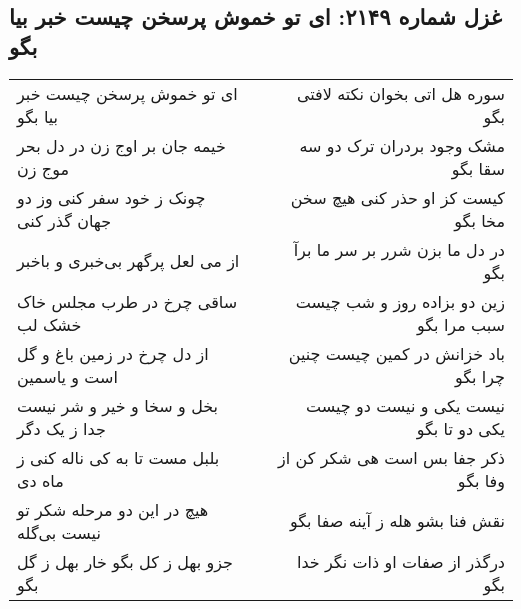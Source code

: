 \begin{center}
\section*{غزل شماره ۲۱۴۹: ای تو خموش پرسخن چیست خبر بیا بگو}
\label{sec:2149}
\begin{longtable}{l p{0.5cm} r}
ای تو خموش پرسخن چیست خبر بیا بگو
&&
سوره هل اتی بخوان نکته لافتی بگو
\\
خیمه جان بر اوج زن در دل بحر موج زن
&&
مشک وجود بردران ترک دو سه سقا بگو
\\
چونک ز خود سفر کنی وز دو جهان گذر کنی
&&
کیست کز او حذر کنی هیچ سخن مخا بگو
\\
از می لعل پرگهر بی‌خبری و باخبر
&&
در دل ما بزن شرر بر سر ما برآ بگو
\\
ساقی چرخ در طرب مجلس خاک خشک لب
&&
زین دو بزاده روز و شب چیست سبب مرا بگو
\\
از دل چرخ در زمین باغ و گل است و یاسمین
&&
باد خزانش در کمین چیست چنین چرا بگو
\\
بخل و سخا و خیر و شر نیست جدا ز یک دگر
&&
نیست یکی و نیست دو چیست یکی دو تا بگو
\\
بلبل مست تا به کی ناله کنی ز ماه دی
&&
ذکر جفا بس است هی شکر کن از وفا بگو
\\
هیچ در این دو مرحله شکر تو نیست بی‌گله
&&
نقش فنا بشو هله ز آینه صفا بگو
\\
جزو بهل ز کل بگو خار بهل ز گل بگو
&&
درگذر از صفات او ذات نگر خدا بگو
\\
\end{longtable}
\end{center}

